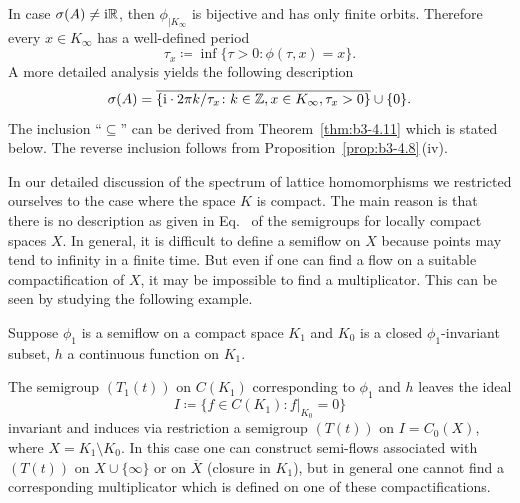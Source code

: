 \begin{remark}\label{rem:b3-4.10}
	In case $\sigma(A) \neq \mathrm{i}\mathbb{R}$, then $\phi_{|K_{\infty}}$ is bijective and has only finite orbits.
	Therefore every $x \in K_{\infty}$ has a well-defined period 
    \[
    \tau_{x} \coloneq \inf\{\tau > 0 \colon \phi(\tau,x) = x\} .
    \]
	A more detailed analysis yields the following description 
	\begin{equation}\label{eq:b3-4.16}
		\sigma(A) = \overline{\{\mathrm{i} \cdot 2\pi k/\tau_{x} \colon k \in \mathbb{Z}, x \in K_{\infty}, \tau_{x} > 0\}} \cup \{0\}.
	\end{equation}
	The inclusion \enquote{$\subseteq$} can be derived from Theorem~\ref{thm:b3-4.11} which is stated below.
	The reverse inclusion follows from Proposition~\ref{prop:b3-4.8}\,(iv).
\end{remark}
	
	In our detailed discussion of the spectrum of lattice homomorphisms we restricted ourselves to the case where the space $K$ is compact.
	The main reason is that there is no description as given in Eq.~ of the semigroups for locally compact spaces $X$.
	In general, it is difficult to define a semiflow on $X$ because points may tend to infinity in a finite time.
	But even if one can find a flow on a suitable compactification of\/ $X$, it may be impossible to find a multiplicator.
	This can be seen by studying the following example.
	
	Suppose $\phi_{1}$ is a semiflow on a compact space $K_{1}$ and $K_{0}$ is a closed $\phi_{1}$-invariant subset, $h$ a continuous function on $K_{1}$.

    The semigroup $(T_{1}(t))$ on $C(K_{1})$ corresponding to $\phi_{1}$ and $h$ leaves the ideal 
    \[
    I \coloneq \{f \in C(K_{1}) \colon f|_{K_{0}} = 0\}
    \] 
    invariant and induces via restriction a semigroup $(T(t))$ on $I = C_{0}(X)$, where $X = K_{1} \setminus K_{0}$.
    In this case one can construct semi-flows associated with $(T(t))$ on $X\cup\{\infty\}$ or on $\overline{X}$ (closure in $K_{1}$), but in general one cannot find a corresponding multiplicator which is defined on one of these compactifications.


